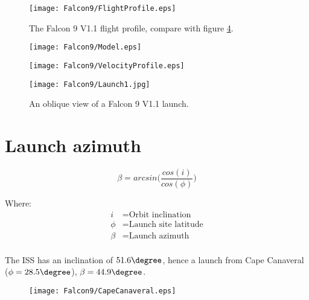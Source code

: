 


\begin{figure}[!htb] 
    \centering
    \texttt{[image: Falcon9/FlightProfile.eps]} 
    \caption{The Falcon 9 V1.1 flight profile, compare with figure \ref{fig:Falcon9Launch}.}
    \label{fig:Falcon9FlightProfile}
\end{figure}


\begin{figure}[!htb] 
    \centering
    \texttt{[image: Falcon9/Model.eps]}
    \caption{}
    \label{fig:Falcon9Model}
\end{figure}


\begin{figure}[!htb] 
    \centering
    \texttt{[image: Falcon9/VelocityProfile.eps]}
    \caption{}
    \label{fig:Falcon9VelocityProfile}
\end{figure}



\begin{figure}[!htb] 
    \centering
    \texttt{[image: Falcon9/Launch1.jpg]}
    \caption{An oblique view of a Falcon 9 V1.1 launch. \cite{SpaceXFalcon9}}
    \label{fig:Falcon9Launch}
\end{figure}


\section{Launch azimuth}

\begin{equation}
\beta = arcsin \Big(\frac{cos(i)}{cos(\phi)}\Big)
\end{equation}

Where:
\begin{align*}
 i &= \text{Orbit inclination}\\
 \phi &= \text{Launch site latitude}\\
 \beta &= \text{Launch azimuth}\\
\end{align*}

\cite{LaunchDesign}

The \ac{ISS} has an inclination of $51.6\degree$, hence a launch from Cape Canaveral ($\phi = 28.5\degree$), $\beta=44.9\degree$.


\begin{figure}[!htb] 
    \centering
    \texttt{[image: Falcon9/CapeCanaveral.eps]}
    \caption{}
    \label{fig:LaunchPath}
\end{figure}


